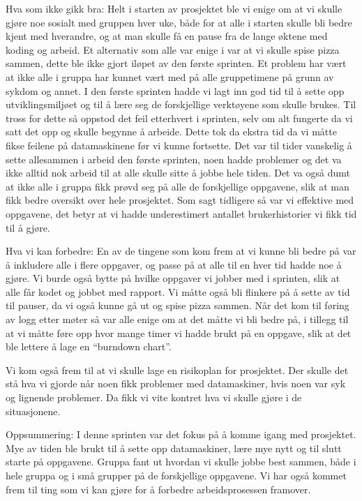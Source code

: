 \documentclass[12pt,a4paper,norsk]{article}
\begin{document}
Hva som ikke gikk bra:
Helt i starten av prosjektet ble vi enige om at vi skulle gjøre noe sosialt med gruppen hver uke, både for at alle i starten skulle bli bedre kjent med hverandre, og at man skulle få en pause fra de lange øktene med koding og arbeid. Et alternativ som alle var enige i var at vi skulle spise pizza sammen, dette ble ikke gjort iløpet av den første sprinten.  
Et problem har vært at ikke alle i gruppa har kunnet vært med på alle gruppetimene på grunn av sykdom og annet. 
I den første sprinten hadde vi lagt inn god tid til å sette opp utviklingsmiljøet og til å lære seg de forskjellige verktøyene som skulle brukes. Til tross for dette så oppstod det feil etterhvert i sprinten, selv om alt fungerte da vi satt det opp og skulle begynne å arbeide. Dette tok da ekstra tid da vi måtte fikse feilene på datamaskinene før vi kunne fortsette. 
Det var til tider vanskelig å sette allesammen i arbeid den første sprinten, noen hadde problemer og det va ikke alltid nok arbeid til at alle skulle sitte å jobbe hele tiden. Det va også dumt at ikke alle i gruppa fikk prøvd seg på alle de forskjellige oppgavene, slik at man fikk bedre oversikt over hele prosjektet. 
Som sagt tidligere så var vi effektive med oppgavene, det betyr at vi hadde underestimert antallet brukerhistorier vi fikk tid til å gjøre.


Hva vi kan forbedre:
En av de tingene som kom frem at vi kunne bli bedre på var å inkludere alle i flere oppgaver, og passe på at alle til en hver tid hadde noe å gjøre. Vi burde også bytte på hvilke oppgaver vi jobber med i sprinten, slik at alle får kodet og jobbet med rapport.
Vi måtte også bli flinkere på å sette av tid til pauser, da vi også kunne gå ut og spise pizza sammen. 
Når det kom til føring av logg etter møter så var alle enige om at det måtte vi bli bedre på, i tillegg til at vi måtte føre opp hvor mange timer vi hadde brukt på en oppgave, slik at det ble lettere å lage en “burndown chart”.

Vi kom også frem til at vi skulle lage en risikoplan for prosjektet. Der skulle det stå hva vi gjorde når noen fikk problemer med datamaskiner, hvis noen var syk og lignende problemer. Da fikk vi vite kontret hva vi skulle gjøre i de situasjonene. 

Oppsummering:
I denne sprinten var det fokus på å komme igang med prosjektet. Mye av tiden ble brukt til å sette opp datamaskiner, lære mye nytt og til slutt starte på oppgavene. Gruppa fant ut hvordan vi skulle jobbe best sammen, både i hele gruppa og i små grupper på de forskjellige oppgavene. Vi har også kommet frem til ting som vi kan gjøre for å forbedre arbeidsprosessen framover. 
\end{document}
